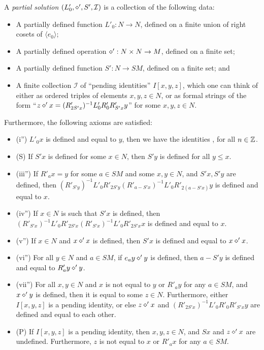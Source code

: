 \begin{definition}\label{part-sol}\leanok  A \emph{partial solution} $(L'_0, \diamond', S', {\mathcal I})$ is a collection of the following data:
\begin{itemize}
  \item A partially defined function $L'_0: N \to N$, defined on a finite union of right cosets of $\langle e_0\rangle$;
  \item A partially defined operation $\diamond': N \times N \to M$, defined on a finite set;
  \item A partially defined function $S': N \to SM$, defined on a finite set; and
  \item A finite collection ${\mathcal  I}$ of ``pending identities'' $I[x,y,z]$, which one can think of either as ordered triples of elements $x,y,z \in N$, or as formal strings of the form ``$z \diamond' x = (R'_{2S'x})^{-1} L'_0 R'_0 R'_{S'x} y$'' for some $x,y,z \in N$.
\end{itemize}

Furthermore, the following axioms are satisfied:
\begin{itemize}
  \item (i'')  $L'_0 x$ is defined and equal to $y$, then we have the identities ,  for all $n\in \mathbb{Z}$.
  \item (S) If $S'x$ is defined for some $x \in N$, then $S'y$ is defined for all $y \leq x$.
  \item (iii'') If $R'_a x = y$ for some $a \in SM$ and some $x,y \in N$, and $S'x, S'y$ are defined, then $(R'_{S'y})^{-1} L'_0 R'_{2S'y} (R'_{a-S'x})^{-1} L'_0 R'_{2(a-S'x)} y$ is defined and equal to $x$.
  \item (iv'') If $x \in N$ is such that $S'x$ is defined, then $(R'_{S'x})^{-1} L'_0 R'_{2S'x} (R'_{S'x})^{-1} L'_0 R'_{2S'x} x$ is defined and equal to $x$.
  \item (v'')  If $x \in N$ and $x \diamond' x$ is defined, then $S'x$ is defined and equal to $x \diamond' x$.
  \item (vi'')  For all $y \in N$ and $a \in SM$, if $e_a y \diamond' y$ is defined, then $a - S'y$ is defined and equal to $R'_a y \diamond' y$.
  \item (vii'')  For all $x,y \in N$ and $x$ is not equal to $y$ or $R'_a y$ for any $a \in SM$, and $x \diamond' y$ is defined, then it is equal to some $z \in N$.  Furthermore, either $I[x,y,z]$ is a pending identity, or else $z \diamond' x$ and $(R'_{2S'x})^{-1} L'_0 R'_0 R'_{S'x} y$ are defined and equal to each other.
  \item (P) If $I[x,y,z]$ is a pending identity, then $x,y,z \in N$, and $Sx$ and $z \diamond' x$ are undefined.  Furthermore, $z$ is not equal to $x$ or $R'_a x$ for any $a \in SM$.
\end{itemize}


\end{definition}
